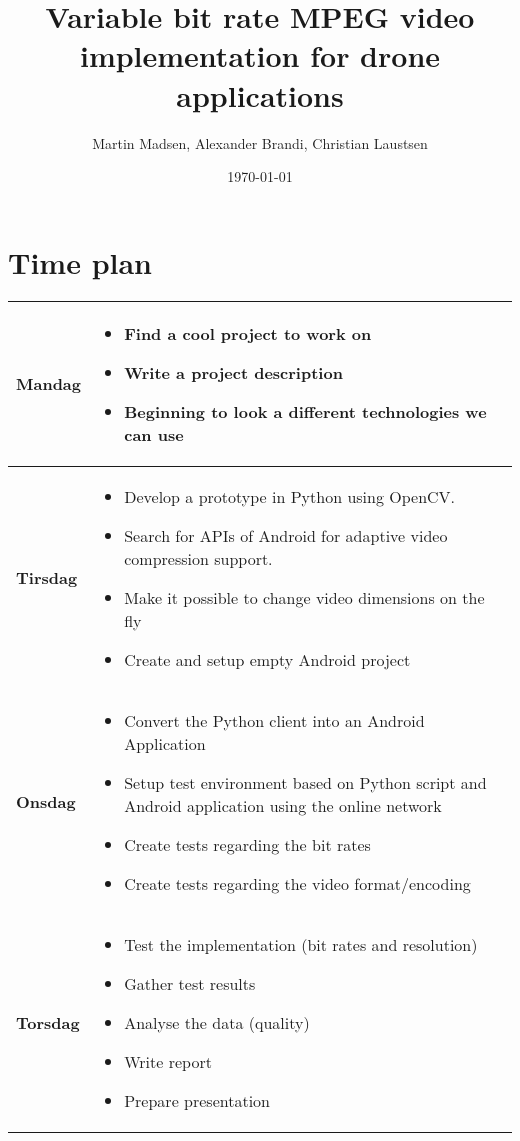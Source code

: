 \documentclass{article}
\title{Variable bit rate MPEG video implementation for drone applications}
\author{Martin Madsen, Alexander Brandi, Christian Laustsen}
\date{\today}
\begin{document}
\maketitle

\section{Time plan}
\begin{table}[!ht]
\centering
\begin{tabular}{|l|p{25em}|}
\hline
\textbf{Mandag} &
\vspace{-\baselineskip}
\begin{itemize}
\item Find a cool project to work on
\item Write a project description
\item Beginning to look a different technologies we can use
\end{itemize}\\

\hline
\textbf{Tirsdag} & 
\vspace{-\baselineskip}
\begin{itemize}
\item Develop a prototype in Python using OpenCV.
\item Search for APIs of Android for adaptive video compression support.
\item Make it possible to change video dimensions on the fly
\item Create and setup empty Android project 
\end{itemize}\\

\hline
\textbf{Onsdag} & 
\vspace{-\baselineskip}
\begin{itemize}
\item Convert the Python client into an Android Application
\item Setup test environment based on Python script and Android application using the online network
\item Create tests regarding the bit rates
\item Create tests regarding the video format/encoding
\end{itemize}\\

\hline
\textbf{Torsdag} & 
\vspace{-\baselineskip}
\begin{itemize}
\item Test the implementation (bit rates and resolution)
\item Gather test results
\item Analyse the data (quality)
\item Write report
\item Prepare presentation
\end{itemize}\\


\end{tabular}
\end{table}
\end{document}

